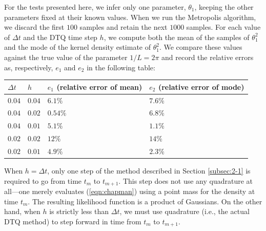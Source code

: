 \documentclass[graybox]{svmult}
\begin{document}
For the tests presented here, we infer only one parameter, $\theta_1$, keeping the other parameters fixed at their known values.  When we run the Metropolis algorithm, we discard the first $100$ samples and retain the next $1000$ samples.  For each value of $\Delta t$ and the DTQ time step $h$, we compute both the mean of the samples of $\theta_1^2$ and the mode of the kernel density estimate of $\theta_1^2$.  We compare these values against the true value of the parameter $1/L = 2 \pi$ and record the relative errors as, respectively, $e_1$ and $e_2$ in the following table:
\begin{center}
\begin{tabular}{llll}
$\Delta t$ & $h$ & $e_1$ (relative error of mean) & $e_2$ (relative error of mode) \\ \hline
$0.04$ & $0.04$ & $6.1\%$ & $7.6\%$ \\
$0.04$ & $0.02$ & $0.54\%$ & $6.8\%$ \\
$0.04$ & $0.01$ & $5.1\%$ & $1.1\%$ \\
$0.02$ & $0.02$ & $12\%$ & $14\%$ \\
$0.02$ & $0.01$ & $4.9\%$ & $2.3\%$
\end{tabular}
\end{center}
When $h = \Delta t$, only one step of the method described in Section \ref{subsec:2-1} is required to go from time $t_m$ to $t_{m+1}$.  This step does not use any quadrature at all---one merely evaluates (\ref{eqn:chapman}) using a point mass for the density at time $t_m$.  The resulting likelihood function is a product of Gaussians.  On the other hand, when $h$ is strictly less than $\Delta t$, we must use quadrature (i.e., the actual DTQ method) to step forward in time from $t_m$ to $t_{m+1}$.
\end{document}
